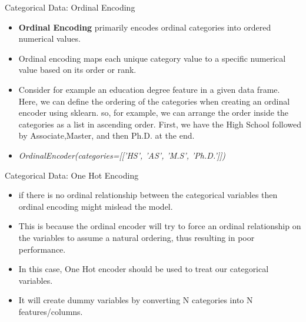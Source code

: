 \documentclass[11pt]{beamer}
\begin{document}
\begin{frame}{Categorical Data: Ordinal Encoding}
	\begin{itemize}
		\item \textbf{Ordinal Encoding} primarily encodes ordinal categories into ordered numerical values. 
		\item Ordinal encoding maps each unique category value to a specific numerical value based on its order or rank. 
		\item Consider for example an education degree feature in a given data frame. Here, we can define the ordering of the categories when creating an ordinal encoder using sklearn. so, for example, we can arrange the order inside the categories as a list in ascending order. First, we have the High School followed by Associate,Master, and then Ph.D. at the end.
		\item \textit{OrdinalEncoder(categories=[['HS', 'AS', 'M.S', 'Ph.D.']])}
	\end{itemize}
\end{frame}
\begin{frame}{Categorical Data: One Hot Encoding}
	\begin{itemize}
		\item if there is no ordinal relationship between the categorical variables then ordinal encoding might mislead the model. 
		\item This is because the ordinal encoder will try to force an ordinal relationship on the variables to assume a natural ordering, thus resulting in poor performance.
		\item In this case, One Hot encoder should be used to treat our categorical variables. 
		\item It will create dummy variables by converting N categories into N features/columns. 
	\end{itemize}
\end{frame}
\end{document}
